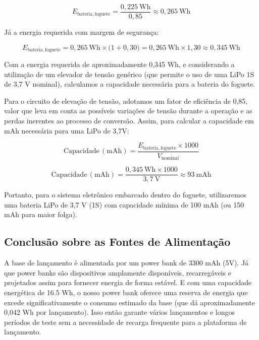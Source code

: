\begin{equation}
E_{\mathrm{bateria,foguete}}
=
\frac{0{,}225~\mathrm{Wh}}{0{,}85}
\approx
0{,}265~\mathrm{Wh}
\end{equation}

Já a energia requerida com margem de segurança:

\begin{equation}
E_{\mathrm{bateria,foguete}}
=
0{,}265~\mathrm{Wh}
\times
\bigl(1 + 0{,}30\bigr)
=
0{,}265~\mathrm{Wh}
\times
1{,}30
\approx
0{,}345~\mathrm{Wh}
\end{equation}

Com a energia requerida de aproximadamente 0,345 Wh, e considerando a utilização de um elevador de tensão genérico (que permite o uso de uma LiPo 1S de 3,7 V nominal), calculamos a capacidade necessária para a bateria do foguete.

Para o circuito de elevação de tensão, adotamos um fator de eficiência de 0,85, valor que leva em conta as possíveis variações de tensão durante a operação e as perdas inerentes ao processo de conversão. Assim, para calcular a capacidade em mAh necessária para uma LiPo de 3,7V:

\begin{equation}
\mathrm{Capacidade\,(mAh)}
=
\frac{E_{\mathrm{bateria,foguete}} \times 1000}{V_{\mathrm{nominal}}}
\end{equation}

\begin{equation}
\mathrm{Capacidade\,(mAh)}
=
\frac{0{,}345~\mathrm{Wh} \times 1000}{3{,}7~\mathrm{V}}
\approx
93~\mathrm{mAh}
\end{equation}

Portanto, para o sistema eletrônico embarcado dentro do foguete, utilizaremos uma bateria LiPo de 3,7 V (1S) com capacidade mínima de 100 mAh (ou 150 mAh para maior folga).

\subsection{Conclusão sobre as Fontes de Alimentação}

A base de lançamento é alimentada por um power bank de 3300 mAh (5V). Já que power banks são dispositivos amplamente disponíveis, recarregáveis e projetados assim para fornecer energia de forma estável. E com uma capacidade energética de 16.5 Wh, o nosso power bank oferece uma reserva de energia que excede significativamente o consumo estimado da base (que dá aproximadamente 0,042 Wh por lançamento). Isso então garante vários lançamentos e longos períodos de teste sem a necessidade de recarga frequente para a plataforma de lançamento. 